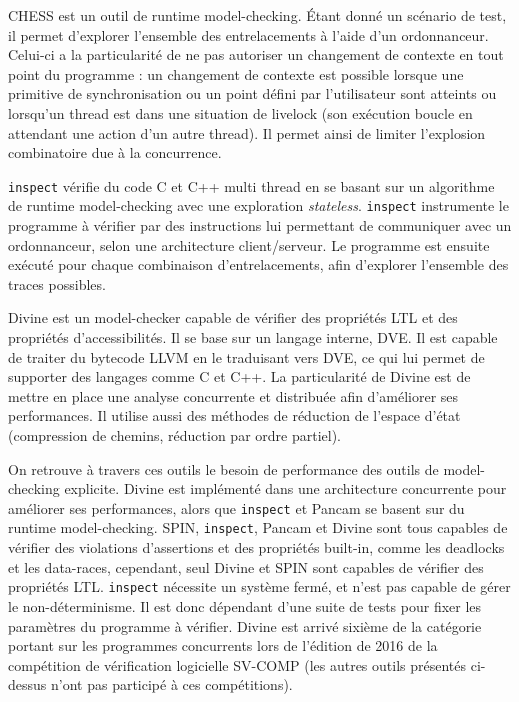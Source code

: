 CHESS\cite{Chess} est un outil de runtime model-checking. Étant donné un
scénario de test, il permet d'explorer l'ensemble des entrelacements à l'aide
d'un ordonnanceur. Celui-ci a la particularité de ne pas autoriser un changement
de contexte en tout point du programme : un changement de contexte est possible
lorsque une primitive de synchronisation ou un point défini par l'utilisateur
sont atteints ou lorsqu'un thread est dans une situation de livelock (son
exécution boucle en attendant une action d'un autre thread). Il permet ainsi de
limiter l'explosion combinatoire due à la concurrence.

\texttt{inspect}\cite{inspect} vérifie du code C et C++
multi thread en se basant sur un algorithme de runtime model-checking
avec une exploration \emph{stateless}. \texttt{inspect} instrumente
le programme à vérifier par des instructions lui permettant de
communiquer avec un ordonnanceur, selon une architecture client/serveur.
Le programme est ensuite exécuté pour chaque combinaison d'entrelacements,
afin d'explorer l'ensemble des traces possibles.

Divine\cite{Divine_3_0} est un model-checker capable de vérifier des
propriétés \ac{LTL} et des propriétés d'accessibilités. Il se base sur un
langage interne, DVE. Il est capable de traiter du bytecode LLVM en le
traduisant vers DVE, ce qui lui permet de supporter des langages comme C
et C++. La particularité de Divine est de mettre en place une analyse
concurrente et distribuée afin d'améliorer ses performances. Il utilise
aussi des méthodes de réduction de l'espace d'état (compression de
chemins, réduction par ordre partiel).

On retrouve à travers ces outils le besoin de performance des outils de
model-checking explicite. Divine est implémenté dans une architecture
concurrente pour améliorer ses performances, alors que \texttt{inspect} et
Pancam se basent sur du runtime model-checking. SPIN, \texttt{inspect}, Pancam
et Divine sont tous capables de vérifier des violations d'assertions et des
propriétés built-in, comme les deadlocks et les data-races, cependant, seul
Divine et SPIN sont capables de vérifier des propriétés \ac{LTL}.
\texttt{inspect} nécessite un système fermé, et n'est pas capable de gérer le
non-déterminisme. Il est donc dépendant d'une suite de tests pour fixer les
paramètres du programme à vérifier. Divine est arrivé sixième de la catégorie
portant sur les programmes concurrents lors de l'édition de 2016 de la
compétition de vérification logicielle SV-COMP\citep{svcomp_2016_result} (les
autres outils présentés ci-dessus n'ont pas participé à ces compétitions).

